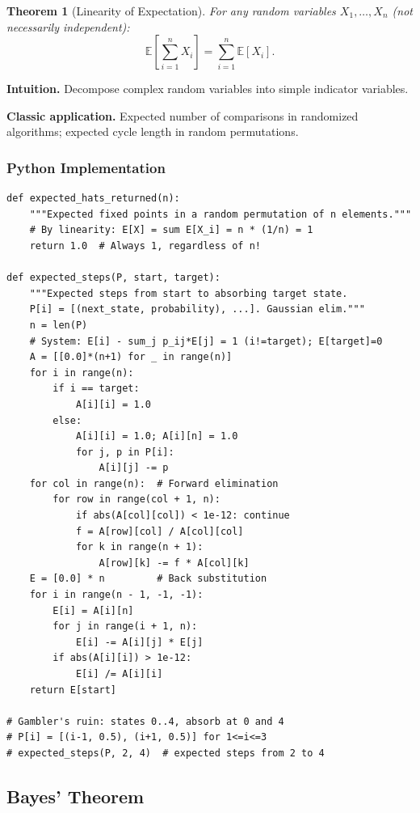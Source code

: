 \documentclass[10pt,a4paper]{article}
\theoremstyle{cpstyle}
\newtheorem{theorem}{Theorem}[section]
\begin{document}
\begin{theorem}[Linearity of Expectation]
For any random variables $X_1, \ldots, X_n$ (not necessarily independent):
\[
  \mathbb{E}\left[\sum_{i=1}^n X_i\right] = \sum_{i=1}^n \mathbb{E}[X_i].
\]
\end{theorem}

\textbf{Intuition.} Decompose complex random variables into simple indicator variables.

\textbf{Classic application.} Expected number of comparisons in randomized algorithms; expected cycle length in random permutations.

\subsubsection{Python Implementation}
\begin{lstlisting}[caption={Expected value via linearity -- hat-check problem}]
def expected_hats_returned(n):
    """Expected fixed points in a random permutation of n elements."""
    # By linearity: E[X] = sum E[X_i] = n * (1/n) = 1
    return 1.0  # Always 1, regardless of n!

def expected_steps(P, start, target):
    """Expected steps from start to absorbing target state.
    P[i] = [(next_state, probability), ...]. Gaussian elim."""
    n = len(P)
    # System: E[i] - sum_j p_ij*E[j] = 1 (i!=target); E[target]=0
    A = [[0.0]*(n+1) for _ in range(n)]
    for i in range(n):
        if i == target:
            A[i][i] = 1.0
        else:
            A[i][i] = 1.0; A[i][n] = 1.0
            for j, p in P[i]:
                A[i][j] -= p
    for col in range(n):  # Forward elimination
        for row in range(col + 1, n):
            if abs(A[col][col]) < 1e-12: continue
            f = A[row][col] / A[col][col]
            for k in range(n + 1):
                A[row][k] -= f * A[col][k]
    E = [0.0] * n         # Back substitution
    for i in range(n - 1, -1, -1):
        E[i] = A[i][n]
        for j in range(i + 1, n):
            E[i] -= A[i][j] * E[j]
        if abs(A[i][i]) > 1e-12:
            E[i] /= A[i][i]
    return E[start]

# Gambler's ruin: states 0..4, absorb at 0 and 4
# P[i] = [(i-1, 0.5), (i+1, 0.5)] for 1<=i<=3
# expected_steps(P, 2, 4)  # expected steps from 2 to 4
\end{lstlisting}

\subsection{Bayes' Theorem}
\end{document}
